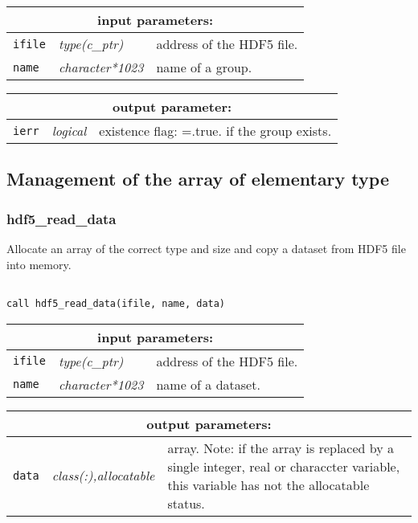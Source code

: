 \noindent
\begin{tabular}{|p{1.5cm}|p{3cm}|p{10cm}|}
\hline
\multicolumn{3}{|c|}{\bf input parameters:} \\
\hline
{\tt ifile} & {\it type(c\_ptr)} & address of the HDF5 file. \\
\hline
{\tt name} & {\it character*1023} & name of a group. \\
\hline
\end{tabular}

\vskip 0.8cm

\noindent
\begin{tabular}{|p{1.5cm}|p{3cm}|p{10cm}|}
\hline
\multicolumn{3}{|c|}{\bf output parameter:} \\
\hline
{\tt ierr} & {\it logical} & existence flag: =.true. if the group exists. \\
\hline
\end{tabular}

\vskip 0.8cm

\subsection{Management of the array of elementary type}

\subsubsection{hdf5\_read\_data}

Allocate an array of the correct type and size and copy a dataset from HDF5 file into memory.

\begin{verbatim}

call hdf5_read_data(ifile, name, data)
\end{verbatim}

\noindent
\begin{tabular}{|p{1.5cm}|p{3cm}|p{10cm}|}
\hline
\multicolumn{3}{|c|}{\bf input parameters:} \\
\hline
{\tt ifile} & {\it type(c\_ptr)} & address of the HDF5 file. \\
\hline
{\tt name} & {\it character*1023} & name of a dataset. \\
\hline
\end{tabular}

\vskip 0.8cm

\noindent
\begin{tabular}{|p{1.5cm}|p{3.5cm}|p{9.5cm}|}
\hline
\multicolumn{3}{|c|}{\bf output parameters:} \\
\hline
{\tt data} & {\it class(:),allocatable} & array. Note: if the array is replaced by a single integer, real or characcter variable,
this variable has not the allocatable status.\\
\hline
\end{tabular}

